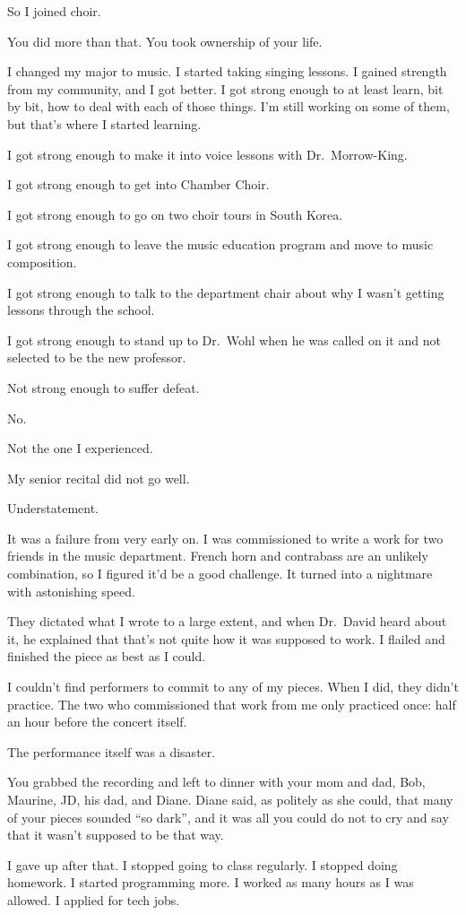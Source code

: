 \begin{paracol}{2}
\begin{leftcolumn}
So I joined choir.

\begin{ally}
You did more than that. You took ownership of your life.
\end{ally}
I changed my major to music. I started taking singing lessons. I gained strength from my community, and I got better. I got strong enough to at least learn, bit by bit, how to deal with each of those things. I'm still working on some of them, but that's where I started learning.

I got strong enough to make it into voice lessons with Dr.~Morrow-King.

I got strong enough to get into Chamber Choir.

I got strong enough to go on two choir tours in South Korea.

I got strong enough to leave the music education program and move to music composition.

I got strong enough to talk to the department chair about why I wasn't getting lessons through the school.

I got strong enough to stand up to Dr.~Wohl when he was called on it and not selected to be the new professor.

\begin{ally}
Not strong enough to suffer defeat.
\end{ally}
No.

Not the one I experienced.
\newpage

\noindent My senior recital did not go well.

\begin{ally}
Understatement.
\end{ally}
It was a failure from very early on. I was commissioned to write a work for two friends in the music department. French horn and contrabass are an unlikely combination, so I figured it'd be a good challenge. It turned into a nightmare with astonishing speed.

They dictated what I wrote to a large extent, and when Dr.~David heard about it, he explained that that's not quite how it was supposed to work. I flailed and finished the piece as best as I could.

I couldn't find performers to commit to any of my pieces. When I did, they didn't practice. The two who commissioned that work from me only practiced once: half an hour before the concert itself.

The performance itself was a disaster.

\begin{ally}
You grabbed the recording and left to dinner with your mom and dad, Bob, Maurine, JD, his dad, and Diane. Diane said, as politely as she could, that many of your pieces sounded ``so dark'', and it was all you could do not to cry and say that it wasn't supposed to be that way.
\end{ally}
I gave up after that. I stopped going to class regularly. I stopped doing homework. I started programming more. I worked as many hours as I was allowed. I applied for tech jobs.


\end{leftcolumn}
\end{paracol}
